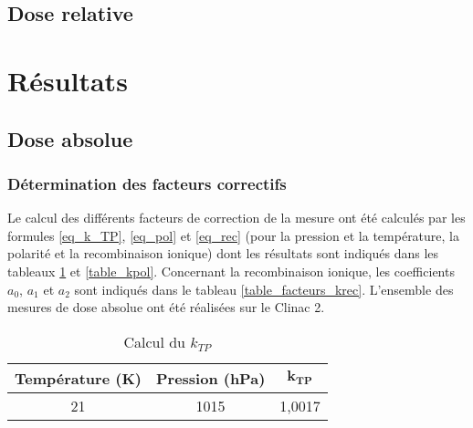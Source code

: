 \documentclass{article}
\begin{document}
\subsection{Dose relative}

\newpage
\section{Résultats}
\subsection{Dose absolue}
\subsubsection{Détermination des facteurs correctifs}

Le calcul des différents facteurs de correction de la mesure ont été calculés par les formules \ref*{eq_k_TP}, \ref*{eq_pol} et \ref*{eq_rec} (pour la pression et la température, la polarité et la recombinaison ionique) dont les résultats sont indiqués dans les tableaux \ref*{table_ktp} et \ref*{table_kpol}. Concernant la recombinaison ionique, les coefficients $a_0$, $a_1$ et $a_2$ sont indiqués dans le tableau \ref*{table_facteurs_krec}. L'ensemble des mesures de dose absolue ont été réalisées sur le Clinac 2.

\begin{table}[h]
  \centering
  \begin{tabular}{ccc}
    \toprule
    \textbf{Température (K)} & \textbf{Pression (hPa)} & $\mathbf{k_{TP}}$ \\
    \toprule
    21 & 1015 & 1,0017 \\
    \bottomrule
  \end{tabular}
  \caption{Calcul du $k_{TP}$}
  \label{table_ktp}
\end{table}

\end{document}
